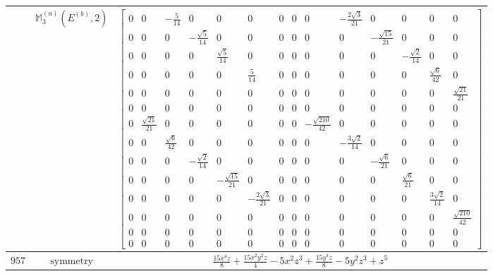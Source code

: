 \documentclass[fleqn,8pt,landscape]{jsarticle}
\begin{document}
\begin{longtable}{ccc}
$  $ & $ \mathbb{M}_{3}^{(a)}(E^{(b)},2) $ & $ \begin{bmatrix} 0 & 0 & - \frac{5}{14} & 0 & 0 & 0 & 0 & 0 & 0 & - \frac{2 \sqrt{3}}{21} & 0 & 0 & 0 & 0 \\ 0 & 0 & 0 & - \frac{\sqrt{5}}{14} & 0 & 0 & 0 & 0 & 0 & 0 & - \frac{\sqrt{15}}{21} & 0 & 0 & 0 \\ 0 & 0 & 0 & 0 & \frac{\sqrt{5}}{14} & 0 & 0 & 0 & 0 & 0 & 0 & - \frac{\sqrt{2}}{14} & 0 & 0 \\ 0 & 0 & 0 & 0 & 0 & \frac{5}{14} & 0 & 0 & 0 & 0 & 0 & 0 & \frac{\sqrt{6}}{42} & 0 \\ 0 & 0 & 0 & 0 & 0 & 0 & 0 & 0 & 0 & 0 & 0 & 0 & 0 & \frac{\sqrt{21}}{21} \\ 0 & 0 & 0 & 0 & 0 & 0 & 0 & 0 & 0 & 0 & 0 & 0 & 0 & 0 \\ 0 & \frac{\sqrt{21}}{21} & 0 & 0 & 0 & 0 & 0 & 0 & - \frac{\sqrt{210}}{42} & 0 & 0 & 0 & 0 & 0 \\ 0 & 0 & \frac{\sqrt{6}}{42} & 0 & 0 & 0 & 0 & 0 & 0 & - \frac{3 \sqrt{2}}{14} & 0 & 0 & 0 & 0 \\ 0 & 0 & 0 & - \frac{\sqrt{2}}{14} & 0 & 0 & 0 & 0 & 0 & 0 & - \frac{\sqrt{6}}{21} & 0 & 0 & 0 \\ 0 & 0 & 0 & 0 & - \frac{\sqrt{15}}{21} & 0 & 0 & 0 & 0 & 0 & 0 & \frac{\sqrt{6}}{21} & 0 & 0 \\ 0 & 0 & 0 & 0 & 0 & - \frac{2 \sqrt{3}}{21} & 0 & 0 & 0 & 0 & 0 & 0 & \frac{3 \sqrt{2}}{14} & 0 \\ 0 & 0 & 0 & 0 & 0 & 0 & 0 & 0 & 0 & 0 & 0 & 0 & 0 & \frac{\sqrt{210}}{42} \\ 0 & 0 & 0 & 0 & 0 & 0 & 0 & 0 & 0 & 0 & 0 & 0 & 0 & 0 \\ 0 & 0 & 0 & 0 & 0 & 0 & 0 & 0 & 0 & 0 & 0 & 0 & 0 & 0 \end{bmatrix} $ \\ \hline
$ 957 $ & $ \text{symmetry} $ & $ \frac{15 x^{4} z}{8} + \frac{15 x^{2} y^{2} z}{4} - 5 x^{2} z^{3} + \frac{15 y^{4} z}{8} - 5 y^{2} z^{3} + z^{5} $ \\

\end{longtable}
\end{document}
